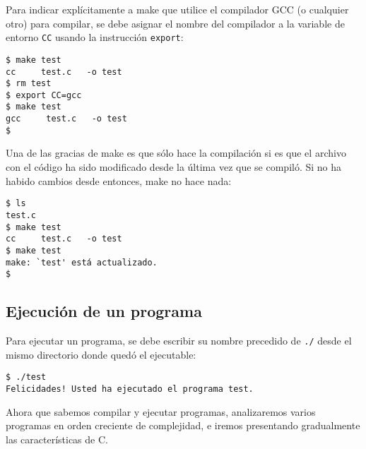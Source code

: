 Para indicar explícitamente a make que utilice el compilador GCC (o
cualquier otro) para compilar, se debe asignar el nombre del compilador
a la variable de entorno \lstinline!CC! usando la instrucción
\lstinline!export!:

\begin{lstlisting}
$ make test
cc     test.c   -o test
$ rm test
$ export CC=gcc
$ make test
gcc     test.c   -o test
$
\end{lstlisting}

Una de las gracias de make es que sólo hace la compilación si es que el
archivo con el código ha sido modificado desde la última vez que se
compiló. Si no ha habido cambios desde entonces, make no hace nada:

\begin{lstlisting}
$ ls
test.c
$ make test
cc     test.c   -o test
$ make test
make: `test' está actualizado.
$
\end{lstlisting}

\subsection{Ejecución de un programa}

Para ejecutar un programa, se debe escribir su nombre precedido de
\lstinline!./! desde el mismo directorio donde quedó el ejecutable:

\begin{lstlisting}
$ ./test
Felicidades! Usted ha ejecutado el programa test.
\end{lstlisting}

Ahora que sabemos compilar y ejecutar programas, analizaremos varios
programas en orden creciente de complejidad, e iremos presentando
gradualmente las características de C.
